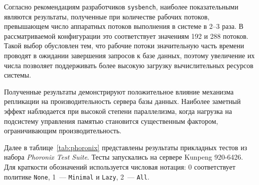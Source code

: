 Согласно рекомендациям разработчиков \texttt{sysbench}, наиболее показательными являются результаты, полученные при количестве рабочих потоков, превышающем число аппаратных потоков выполнения в системе в 2--3 раза. В рассматриваемой конфигурации это соответствует значениям 192 и 288 потоков. Такой выбор обусловлен тем, что рабочие потоки значительную часть времени проводят в ожидании завершения запросов к базе данных, поэтому увеличение их числа позволяет поддерживать более высокую загрузку вычислительных ресурсов системы.

Полученные результаты демонстрируют положительное влияние механизма репликации на производительность сервера базы данных. Наиболее заметный эффект наблюдается при высокой степени параллелизма, когда нагрузка на подсистему управления памятью становится существенным фактором, ограничивающим производительность.

Далее в таблице~\ref{tab:phoronix} представлены результаты прикладных тестов из набора \textit{Phoronix Test Suite}. Тесты запускались на сервере Kunpeng 920-6426. Для краткости обозначений используется числовая нотация: 0 соответствует политике \texttt{None}, 1~--- \texttt{Minimal} и \texttt{Lazy}, 2~--- \texttt{All}.

